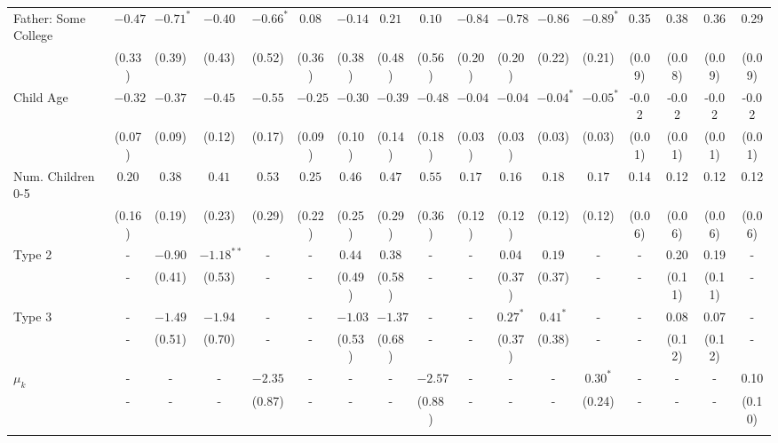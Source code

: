 \begin{tabular}{lcccccccccccccccc}
Father: Some College&$-0.47$&$-0.71^{*}$&$-0.40$&$-0.66^{*}$&$0.08$&$-0.14$&$0.21$&$0.10$&$-0.84$&$-0.78$&$-0.86$&$-0.89^{*}$&0.35&0.38&0.36&0.29\\
&(0.33)&(0.39)&(0.43)&(0.52)&(0.36)&(0.38)&(0.48)&(0.56)&(0.20)&(0.20)&(0.22)&(0.21)&(0.09)&(0.08)&(0.09)&(0.09)\\
Child Age&$-0.32$&$-0.37$&$-0.45$&$-0.55$&$-0.25$&$-0.30$&$-0.39$&$-0.48$&$-0.04$&$-0.04$&$-0.04^{*}$&$-0.05^{*}$&-0.02&-0.02&-0.02&-0.02\\
&(0.07)&(0.09)&(0.12)&(0.17)&(0.09)&(0.10)&(0.14)&(0.18)&(0.03)&(0.03)&(0.03)&(0.03)&(0.01)&(0.01)&(0.01)&(0.01)\\
Num. Children 0-5&$0.20$&$0.38$&$0.41$&$0.53$&$0.25$&$0.46$&$0.47$&$0.55$&$0.17$&$0.16$&$0.18$&$0.17$&0.14&0.12&0.12&0.12\\
&(0.16)&(0.19)&(0.23)&(0.29)&(0.22)&(0.25)&(0.29)&(0.36)&(0.12)&(0.12)&(0.12)&(0.12)&(0.06)&(0.06)&(0.06)&(0.06)\\
Type 2&-&$-0.90$&$-1.18^{**}$&-&-&$0.44$&$0.38$&-&-&$0.04$&$0.19$&-&-&0.20&0.19&-\\
&-&(0.41)&(0.53)&-&-&(0.49)&(0.58)&-&-&(0.37)&(0.37)&-&-&(0.11)&(0.11)&-\\
Type 3&-&$-1.49$&$-1.94$&-&-&$-1.03$&$-1.37$&-&-&$0.27^{*}$&$0.41^{*}$&-&-&0.08&0.07&-\\
&-&(0.51)&(0.70)&-&-&(0.53)&(0.68)&-&-&(0.37)&(0.38)&-&-&(0.12)&(0.12)&-\\
$\mu_{k}$&-&-&-&$-2.35$&-&-&-&$-2.57$&-&-&-&$0.30^{*}$&-&-&-&0.10\\
&-&-&-&(0.87)&-&-&-&(0.88)&-&-&-&(0.24)&-&-&-&(0.10)\\
\\
\bottomrule\end{tabular}